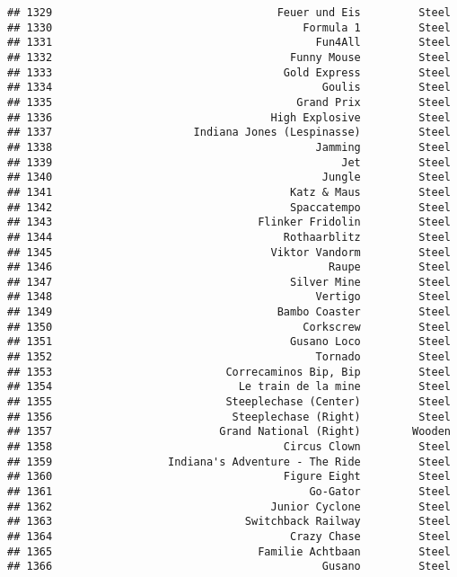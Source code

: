 \documentclass[
]{article}
\begin{document}
\begin{verbatim}
## 1329                                   Feuer und Eis         Steel
## 1330                                       Formula 1         Steel
## 1331                                         Fun4All         Steel
## 1332                                     Funny Mouse         Steel
## 1333                                    Gold Express         Steel
## 1334                                          Goulis         Steel
## 1335                                      Grand Prix         Steel
## 1336                                  High Explosive         Steel
## 1337                      Indiana Jones (Lespinasse)         Steel
## 1338                                         Jamming         Steel
## 1339                                             Jet         Steel
## 1340                                          Jungle         Steel
## 1341                                     Katz & Maus         Steel
## 1342                                     Spaccatempo         Steel
## 1343                                Flinker Fridolin         Steel
## 1344                                    Rothaarblitz         Steel
## 1345                                  Viktor Vandorm         Steel
## 1346                                           Raupe         Steel
## 1347                                     Silver Mine         Steel
## 1348                                         Vertigo         Steel
## 1349                                   Bambo Coaster         Steel
## 1350                                       Corkscrew         Steel
## 1351                                     Gusano Loco         Steel
## 1352                                         Tornado         Steel
## 1353                           Correcaminos Bip, Bip         Steel
## 1354                             Le train de la mine         Steel
## 1355                           Steeplechase (Center)         Steel
## 1356                            Steeplechase (Right)         Steel
## 1357                          Grand National (Right)        Wooden
## 1358                                    Circus Clown         Steel
## 1359                  Indiana's Adventure - The Ride         Steel
## 1360                                    Figure Eight         Steel
## 1361                                        Go-Gator         Steel
## 1362                                  Junior Cyclone         Steel
## 1363                              Switchback Railway         Steel
## 1364                                     Crazy Chase         Steel
## 1365                                Familie Achtbaan         Steel
## 1366                                          Gusano         Steel

\end{verbatim}
\end{document}
